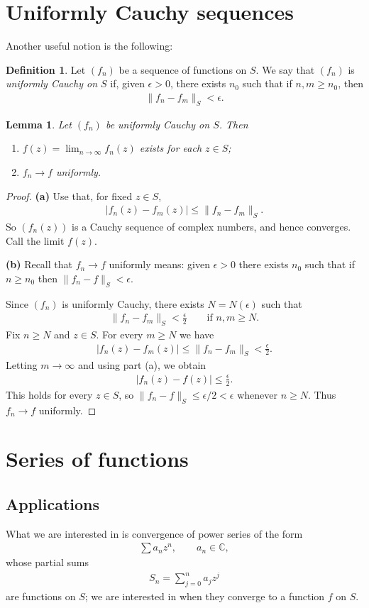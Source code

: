 \documentclass[11pt]{article}
\theoremstyle{plain}
\newtheorem{lemma}[theorem]{Lemma}
\theoremstyle{definition}
\newtheorem{definition}[theorem]{Definition}
\theoremstyle{remark}
\numberwithin{equation}{section}
\newcommand{\be}{\begin{eqnarray}}
\newcommand{\ee}{\end{eqnarray}}
\newcommand{\C}{\mathbb{C}}
\begin{document}
\section{Uniformly Cauchy sequences}
Another useful notion is the following:

\begin{definition}
Let $(f_n)$ be a sequence of functions on $S$. We say that $(f_n)$ is
\emph{uniformly Cauchy on $S$} if, given $\epsilon>0$, there exists $n_0$
such that if $n,m\ge n_0$, then
\be
 \|f_n-f_m\|_S<\epsilon.
\ee
\end{definition}
\begin{lemma}
\label{lem:unif-cauchy}
Let $(f_n)$ be uniformly Cauchy on $S$. Then
\begin{enumerate}
\item[(a)] $\displaystyle f(z)=\lim_{n\to\infty}f_n(z)$ exists for each
$z\in S$;
\item[(b)] $f_n\to f$ uniformly.
\end{enumerate}
\end{lemma}

\begin{proof}
\textbf{(a)} Use that, for fixed $z\in S$,
\be
 |f_n(z)-f_m(z)|\le\|f_n-f_m\|_S.
\ee
So $(f_n(z))$ is a Cauchy sequence of complex numbers, and hence
converges. Call the limit $f(z)$.

\textbf{(b)} Recall that $f_n\to f$ uniformly means: given $\epsilon>0$
there exists $n_0$ such that if $n\ge n_0$ then $\|f_n-f\|_S<\epsilon$.

Since $(f_n)$ is uniformly Cauchy, there exists $N=N(\epsilon)$ such that
\be
 \|f_n-f_m\|_S<\frac\epsilon2\qquad\text{if }n,m\ge N.
\ee
Fix $n\ge N$ and $z\in S$. For every $m\ge N$ we have
\be
 |f_n(z)-f_m(z)|\le \|f_n-f_m\|_S<\frac\epsilon2.
\ee
Letting $m\to\infty$ and using part (a), we obtain
\be
 |f_n(z)-f(z)|\le\frac\epsilon2.
\ee
This holds for every $z\in S$, so
$\|f_n-f\|_S\le\epsilon/2<\epsilon$ whenever $n\ge N$. Thus $f_n\to f$
uniformly.
\end{proof}

\section{Series of functions}
\subsection*{Applications}
What we are interested in is convergence of power series of the form
\be
 \sum a_nz^n,\qquad a_n\in\C,
\ee
whose partial sums
\be
 S_n=\sum_{j=0}^{n}a_jz^j
\ee
are functions on $S$; we are interested in when they converge to a function
$f$ on $S$.
\end{document}
